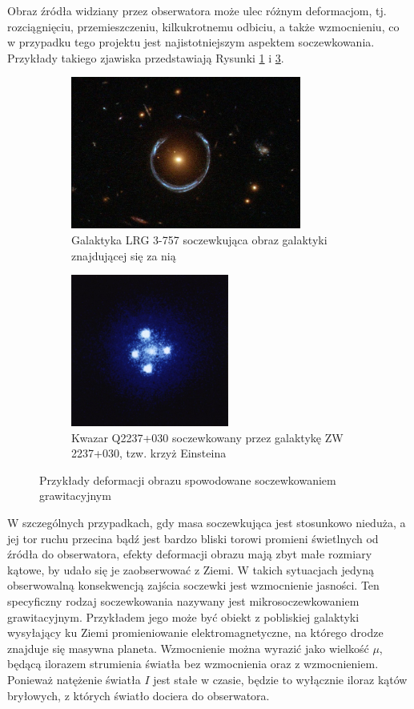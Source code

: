 \documentclass[a4paper,11pt]{article}
\newcommand{\ak}{\hspace{0.7 cm}}
\begin{document}
\ak Obraz źródła widziany przez obserwatora może ulec różnym deformacjom, tj. rozciągnięciu, przemieszczeniu, kilkukrotnemu odbiciu, a także wzmocnieniu, co w przypadku tego projektu jest najistotniejszym aspektem soczewkowania. Przykłady takiego zjawiska przedstawiają Rysunki \ref{Fig2} i \ref{Fig3}.
\begin{figure}[H]
\begin{subfigure}{0.5\textwidth}
\centering
\includegraphics[width=0.9\linewidth,height=5cm]{Horseshoe.jpeg}
\caption{Galaktyka LRG 3-757 soczewkująca obraz galaktyki znajdującej się za nią \citet{Horseshoe}}
\label{Fig2}
\end{subfigure}
\hspace{0.5cm}
\begin{subfigure}{0.5\textwidth}
\centering
\includegraphics[width=0.9\linewidth,height=5cm]{Cross.jpeg}
\caption{Kwazar Q2237+030 soczewkowany przez galaktykę ZW 2237+030, tzw. krzyż Einsteina \citet{Cross}}
\label{Fig3}
\end{subfigure}
\caption{Przykłady deformacji obrazu spowodowane soczewkowaniem grawitacyjnym}
\end{figure}
\ak W szczególnych przypadkach, gdy masa soczewkująca jest stosunkowo nieduża, a jej tor ruchu przecina bądź jest bardzo bliski torowi promieni świetlnych od źródła do obserwatora, efekty deformacji obrazu mają zbyt małe rozmiary kątowe, by udało się je zaobserwować z Ziemi. W takich sytuacjach jedyną obserwowalną konsekwencją zajścia soczewki jest wzmocnienie jasności. Ten specyficzny rodzaj soczewkowania nazywany jest mikrosoczewkowaniem grawitacyjnym. Przykładem jego może być obiekt z pobliskiej galaktyki wysyłający ku Ziemi promieniowanie elektromagnetyczne, na którego drodze znajduje się masywna planeta. Wzmocnienie można wyrazić jako wielkość $\mu$, będącą ilorazem strumienia światła bez wzmocnienia oraz z wzmocnieniem. Ponieważ natężenie światła $I$ jest stałe w czasie, będzie to wyłącznie iloraz kątów bryłowych, z których światło dociera do  obserwatora.\\
\end{document}
